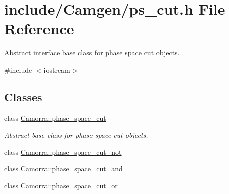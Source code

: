\hypertarget{a00580}{
\section{include/Camgen/ps\_\-cut.h File Reference}
\label{a00580}
}


Abstract interface base class for phase space cut objects.  


{\ttfamily \#include $<$iostream$>$}\par
\subsection*{Classes}
\begin{DoxyCompactItemize}
\item 
class \hyperlink{a00380}{Camorra::phase\_\-space\_\-cut}
\begin{DoxyCompactList}\small\item\em Abstract base class for phase space cut objects. \end{DoxyCompactList}\item 
class \hyperlink{a00382}{Camorra::phase\_\-space\_\-cut\_\-not}
\item 
class \hyperlink{a00381}{Camorra::phase\_\-space\_\-cut\_\-and}
\item 
class \hyperlink{a00383}{Camorra::phase\_\-space\_\-cut\_\-or}
\end{DoxyCompactItemize}

